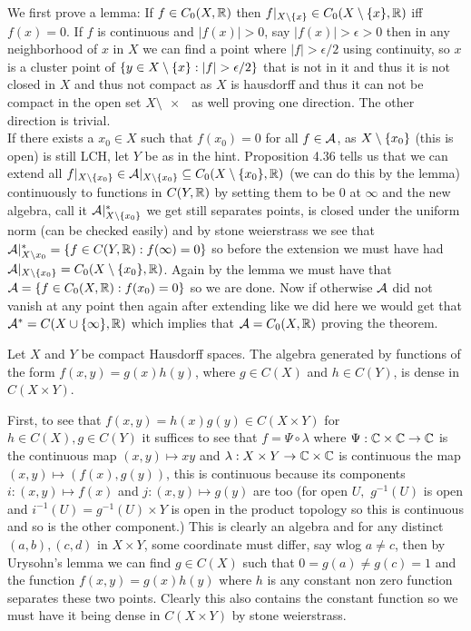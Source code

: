 \documentclass[12pt,a4paper]{article}
\begin{document}
\begin{solution}
We first prove a lemma: If $f\in C_0(X,\mathbb{R})$ then $f|_{X\setminus \qty{x}}\in C_0(X\setminus \qty{x},\mathbb{R})$ iff $f(x)=0.$ 
If $f$ is continuous and $|f(x)|>0$, say $|f(x)|>\epsilon>0$ then in any neighborhood of $x$ in $X$ we can find a point where $|f|>\epsilon/2$ using continuity, so $x$ is a cluster point of $ \qty{y\in X\setminus \qty{x}:|f|>\epsilon/2}$ that is not in it and thus it is not closed in $X$ and thus not compact as $X$ is hausdorff and thus it can not be compact in the open set $X\setminus \qty{x}$ as well proving one direction. 
The other direction is trivial. \\
If there exists a $x_0\in X$ such that $f(x_0)=0$ for all $f\in\mathcal{A}$, as $X\setminus \qty{x_0}$ (this is open) is still LCH, let $Y$ be as in the hint. 
Proposition 4.36 tells us that we can extend all $f|_{X\setminus \qty{x_0}}\in\mathcal{A}|_{X\setminus \qty{x_0}} \subseteq C_0(X\setminus \qty{x_0},\mathbb{R})$ (we can do this by the lemma) continuously to functions in $C(Y,\mathbb{R})$ by setting them to be $0$ at $\infty$ and the new algebra, call it $\mathcal{A}|_{X\setminus \qty{x_0}}^*$ we get still separates points, is closed under the uniform norm (can be checked easily) and by stone weierstrass we see that $\mathcal{A}|_{X\setminus x_0}^* = \qty{f\in C(Y,\mathbb{R}):f(\infty)=0}$ so before the extension we must have had $\mathcal{A}|_{X\setminus \qty{x_0}} = C_0(X\setminus \qty{x_0},\mathbb{R})$. 
Again by the lemma we must have that $\mathcal{A} = \qty{f\in C_0(X,\mathbb{R}):f(x_0)=0}$ so we are done. 
Now if otherwise $\mathcal{A}$ did not vanish at any point then again after extending like we did here we would get that $\mathcal{A}^*=C(X\cup \qty{\infty},\mathbb{R})$ which implies that $\mathcal{A}= C_0(X,\mathbb{R})$ proving the theorem. 
\end{solution}
\begin{problem}\label{prob:4-68}
Let $X$ and $Y$ be compact Hausdorff spaces. The algebra generated by functions of the form $f(x,y) = g(x)h(y)$, where $g \in C(X)$ and $h \in C(Y)$, is dense in $C(X \times Y)$.
\end{problem}
\begin{solution}
    First, to see that $f(x,y)=h(x)g(y)\in C(X\times Y)$ for $h\in C(X),g\in C(Y)$ it suffices to see that $f=\Psi\circ\lambda$ where $\Psi:\mathbb{C}\times\mathbb{C}\to\mathbb{C}$ is the continuous map $(x,y)\mapsto xy$ and $\lambda:X\times Y\to\mathbb{C}\times\mathbb{C}$ is continuous the map $(x,y)\mapsto(f(x),g(y))$, this is continuous because its components $i:(x,y)\mapsto f(x)$ and $j:(x,y)\mapsto g(y)$ are too (for open $U,$ $g^{-1}(U)$ is open and $i^{-1}(U)=g^{-1}(U)\times Y$ is open in the product topology so this is continuous and so is the other component.) 
This is clearly an algebra and for any distinct $(a,b),(c,d)$ in $X\times Y$, some coordinate must differ, say wlog $a\neq c$, then by Urysohn's lemma we can find $g\in C(X)$ such that $0=g(a)\neq g(c)=1$ and the function $f(x,y)=g(x)h(y)$ where $h$ is any constant non zero function separates these two points. 
Clearly this also contains the constant function so we must have it being dense in $C(X\times Y)$ by stone weierstrass. 
\end{solution}
\end{document}
